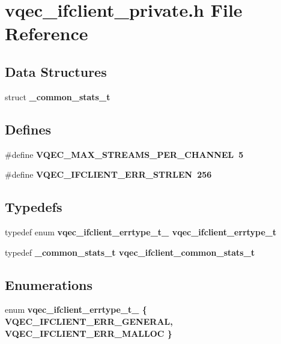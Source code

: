 \section{vqec\_\-ifclient\_\-private.h File Reference}
\label{vqec__ifclient__private_8h}
\subsection*{Data Structures}
\begin{CompactItemize}
\item 
struct \bf{\_\-common\_\-stats\_\-t}
\end{CompactItemize}
\subsection*{Defines}
\begin{CompactItemize}
\item 
\#define \bf{VQEC\_\-MAX\_\-STREAMS\_\-PER\_\-CHANNEL}~5
\item 
\#define \bf{VQEC\_\-IFCLIENT\_\-ERR\_\-STRLEN}~256
\end{CompactItemize}
\subsection*{Typedefs}
\begin{CompactItemize}
\item 
typedef enum \bf{vqec\_\-ifclient\_\-errtype\_\-t\_\-} \bf{vqec\_\-ifclient\_\-errtype\_\-t}
\item 
typedef \bf{\_\-common\_\-stats\_\-t} \bf{vqec\_\-ifclient\_\-common\_\-stats\_\-t}
\end{CompactItemize}
\subsection*{Enumerations}
\begin{CompactItemize}
\item 
enum \bf{vqec\_\-ifclient\_\-errtype\_\-t\_\-} \{ \bf{VQEC\_\-IFCLIENT\_\-ERR\_\-GENERAL}, 
\bf{VQEC\_\-IFCLIENT\_\-ERR\_\-MALLOC}
 \}
\end{CompactItemize}
